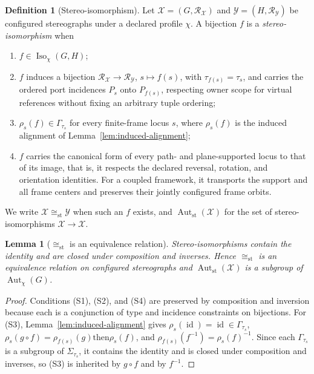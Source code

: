\documentclass[pdflatex,sn-mathphys-num,referee,lineno]{sn-jnl}
\theoremstyle{plain}
\newtheorem{lemma}[theorem]{Lemma}
\theoremstyle{remark}
\theoremstyle{definition}
\newtheorem{definition}{Definition}
\begin{document}
\begin{definition}[Stereo-isomorphism]
\label{def:stereo-isomorphism}
Let \(\mathcal X=(G,\mathcal R_{\mathcal X})\) and
\(\mathcal Y=(H,\mathcal R_{\mathcal Y})\) be configured stereographs under a
declared profile \(\chi\).  A bijection \(f\) is a \emph{stereo-isomorphism}
when
\begin{enumerate}
  \item[(S1)] \(f\in\operatorname{Iso}_\chi(G,H)\);
  \item[(S2)] \(f\) induces a bijection
        \(\mathcal R_{\mathcal X}\to\mathcal R_{\mathcal Y}\),
        \(s\mapsto f(s)\), with \(\tau_{f(s)}=\tau_s\), and carries the ordered
        port incidences \(P_s\) onto \(P_{f(s)}\), respecting owner scope for virtual
        references without fixing an arbitrary tuple ordering;
  \item[(S3)] \(\rho_s(f)\in\Gamma_{\tau_s}\) for every finite-frame locus
        \(s\), where \(\rho_s(f)\) is the induced alignment of
        Lemma~\ref{lem:induced-alignment};
  \item[(S4)] \(f\) carries the canonical form of every path- and
        plane-supported locus to that of its image, that is, it respects the
        declared reversal, rotation, and orientation identities. For a coupled
        framework, it transports the support and all frame centers and
        preserves their jointly configured frame orbits.
\end{enumerate}
We write \(\mathcal X\cong_{\mathrm{st}}\mathcal Y\) when such an \(f\) exists,
and \(\operatorname{Aut}_{\mathrm{st}}(\mathcal X)\) for the set of
stereo-isomorphisms \(\mathcal X\to\mathcal X\).
\end{definition}

\begin{lemma}[\(\cong_{\mathrm{st}}\) is an equivalence relation]
\label{lem:stereo-equivalence}
Stereo-isomorphisms contain the identity and are closed under composition and
inverses.  Hence \(\cong_{\mathrm{st}}\) is an equivalence relation on
configured stereographs and \(\operatorname{Aut}_{\mathrm{st}}(\mathcal X)\) is
a subgroup of \(\operatorname{Aut}_\chi(G)\).
\end{lemma}

\begin{proof}
Conditions (S1), (S2), and (S4) are preserved by composition and inversion
because each is a conjunction of type and incidence constraints on bijections.
For (S3), Lemma~\ref{lem:induced-alignment} gives
\(\rho_s(\operatorname{id})=\operatorname{id}\in\Gamma_{\tau_s}\),
\(\rho_s(g\circ f)=\rho_{f(s)}(g)\mathbin{\mathrm{then}}\rho_s(f)\), and
\(\rho_{f(s)}(f^{-1})=\rho_s(f)^{-1}\).  Since each \(\Gamma_{\tau_s}\) is a
subgroup of \(\Sigma_{\tau_s}\), it contains the identity and is closed under
composition and inverses, so (S3) is inherited by \(g\circ f\) and by
\(f^{-1}\).
\end{proof}
\end{document}
